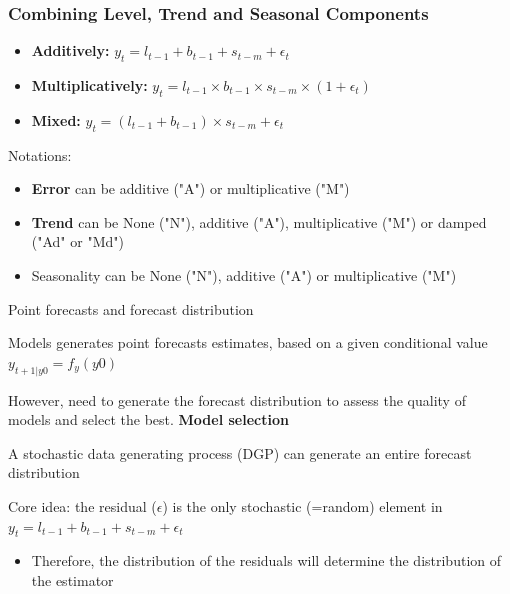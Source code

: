\documentclass{beamer}
\newenvironment{wideitemize}{\itemize\addtolength{\itemsep}{10pt}}{\enditemize}
\begin{document}
\begin{frame}
  \frametitle{Combining Level, Trend and Seasonal Components}

  \begin{itemize}
  \item \textbf{Additively:} $y_t = l_{t-1} + b_{t-1} + s_{t-m} + \epsilon_t$
  \item \textbf{Multiplicatively:} $y_t = l_{t-1} \times b_{t-1} \times s_{t-m} \times (1 + \epsilon_t)$
  \item \textbf{Mixed:} $y_t = (l_{t-1} + b_{t-1}) \times s_{t-m} + \epsilon_t $  
  \end{itemize}

  Notations:
  \begin{itemize}
  \item \textbf{Error} can be additive ("A") or multiplicative ("M")
  \item \textbf{Trend} can be None ("N"), additive ("A"), multiplicative ("M") or damped ("Ad" or "Md")
  \item Seasonality can be None ("N"), additive ("A") or multiplicative ("M")
  \end{itemize}
    
\end{frame}


\begin{frame}{Point forecasts and forecast distribution}

  \begin{wideitemize}
  \item Models generates point forecasts estimates, based on a given conditional value $y_{t+1|y0} = f_y(y0)$ 
  \item However, need to generate the forecast distribution to assess the quality of models and select the best. \textbf{Model selection}
  \item A stochastic data generating process (DGP) can generate an entire forecast distribution
  \item Core idea: the residual ($\epsilon$) is the only stochastic (=random) element in $y_t = l_{t-1} + b_{t-1} + s_{t-m} + \epsilon_t$
    \begin{itemize}
    \item Therefore, the distribution of the residuals will determine the distribution of the estimator
    \end{itemize}
  \end{wideitemize}  
\end{frame}
\end{document}
